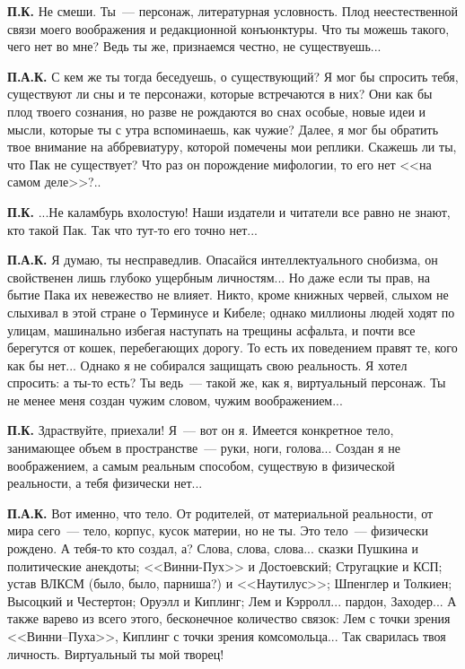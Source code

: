 \documentclass{scrbook}
\newcommand{\flqq}{<<}
\newcommand{\frqq}{>>}
\newcommand{\mdash}{~--- }
\newcommand{\ndash}{--}
\begin{document}
\textbf{П.К.} Не смеши. Ты{\mdash}персонаж, литературная условность. Плод неестественной связи моего воображения и редакционной конъюнктуры. Что ты можешь такого, чего нет во мне? Ведь ты же, признаемся честно, не существуешь...

\textbf{П.А.К.} С кем же ты тогда беседуешь, о существующий? Я мог бы спросить тебя, существуют ли сны и те персонажи, которые встречаются в них? Они как бы плод твоего сознания, но разве не рождаются во снах особые, новые идеи и мысли, которые ты с утра вспоминаешь, как чужие? Далее, я мог бы обратить твое внимание на аббревиатуру, которой помечены мои реплики. Скажешь ли ты, что Пак не существует? Что раз он порождение мифологии, то его нет {\flqq}на самом деле{\frqq}?..

\textbf{П.К.} ...Не каламбурь вхолостую! Наши издатели и читатели все равно не знают, кто такой Пак. Так что тут-то его точно нет...

\textbf{П.А.К.} Я думаю, ты несправедлив. Опасайся интеллектуального снобизма, он свойственен лишь глубоко ущербным личностям... Но даже если ты прав, на бытие Пака их невежество не влияет. Никто, кроме книжных червей, слыхом не слыхивал в этой стране о Терминусе и Кибеле; однако миллионы людей ходят по улицам, машинально избегая наступать на трещины асфальта, и почти все берегутся от кошек, перебегающих дорогу. То есть их поведением правят те, кого как бы нет... Однако я не собирался защищать свою реальность. Я хотел спросить: а ты-то есть? Ты ведь{\mdash}такой же, как я, виртуальный персонаж. Ты не менее меня создан чужим словом, чужим воображением...

\textbf{П.К.} Здраствуйте, приехали! Я{\mdash}вот он я. Имеется конкретное тело, занимающее объем в пространстве{\mdash}руки, ноги, голова... Создан я не воображением, а самым реальным способом, существую в физической реальности, а тебя физически нет...

\textbf{П.А.К.} Вот именно, что тело. От родителей, от материальной реальности, от мира сего{\mdash}тело, корпус, кусок материи, но не ты. Это тело{\mdash}физически рождено. А тебя-то кто создал, а? Слова, слова, слова... сказки Пушкина и политические анекдоты; {\flqq}Винни-Пух{\frqq} и Достоевский; Стругацкие и КСП; устав ВЛКСМ (было, было, парниша?) и {\flqq}Наутилус{\frqq}; Шпенглер и Толкиен; Высоцкий и Честертон; Оруэлл и Киплинг; Лем и Кэрролл... пардон, Заходер... А также варево из всего этого, бесконечное количество связок: Лем с точки зрения {\flqq}Винни{\ndash}Пуха{\frqq}, Киплинг с точки зрения комсомольца... Так сварилась твоя личность. Виртуальный ты мой творец!
\end{document}
